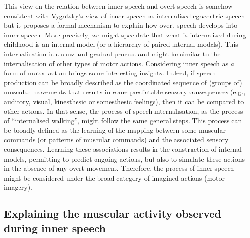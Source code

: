 \documentclass[a4paper,12pt,twoside,onecolumn,openright,final,oldfontcommands]{memoir}
\begin{document}
This view on the relation between inner speech and overt speech is somehow consistent with Vygotsky's view of inner speech as internalised egocentric speech but it proposes a formal mechanism to explain how overt speech develops into inner speech. More precisely, we might speculate that what is internalised during childhood is an internal model (or a hierarchy of paired internal models). This internalisation is a slow and gradual process and might be similar to the internalisation of other types of motor actions. Considering inner speech as \emph{a} form of motor action brings some interesting insights. Indeed, if speech production can be broadly described as the coordinated sequence of (groups of) muscular movements that results in some predictable sensory consequences (e.g., auditory, visual, kinesthesic or somesthesic feelings), then it can be compared to other actions. In that sense, the process of speech internalisation, as the process of \enquote{internalised walking}, might follow the same general steps. This process can be broadly defined as the learning of the mapping between some muscular commands (or patterns of muscular commands) and the associated sensory consequences. Learning these associations results in the construction of internal models, permitting to predict ongoing actions, but also to simulate these actions in the absence of any overt movement. Therefore, the process of inner speech might be considered under the broad category of imagined actions (motor imagery).

\hypertarget{motor-imagery}{%
\subsection{Explaining the muscular activity observed during inner speech}\label{motor-imagery}}
\end{document}
